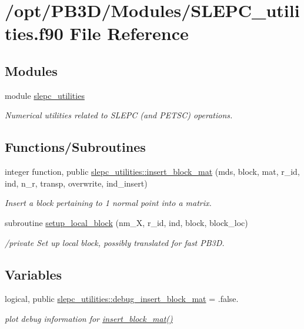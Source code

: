 \hypertarget{SLEPC__utilities_8f90}{}\section{/opt/\+P\+B3\+D/\+Modules/\+S\+L\+E\+P\+C\+\_\+utilities.f90 File Reference}
\label{SLEPC__utilities_8f90}
\subsection*{Modules}
\begin{DoxyCompactItemize}
\item 
module \hyperlink{namespaceslepc__utilities}{slepc\+\_\+utilities}
\begin{DoxyCompactList}\small\item\em Numerical utilities related to S\+L\+E\+PC (and P\+E\+T\+SC) operations. \end{DoxyCompactList}\end{DoxyCompactItemize}
\subsection*{Functions/\+Subroutines}
\begin{DoxyCompactItemize}
\item 
integer function, public \hyperlink{namespaceslepc__utilities_aa34aa361f0bfff9621ecba179f9ed0c6}{slepc\+\_\+utilities\+::insert\+\_\+block\+\_\+mat} (mds, block, mat, r\+\_\+id, ind, n\+\_\+r, transp, overwrite, ind\+\_\+insert)
\begin{DoxyCompactList}\small\item\em Insert a block pertaining to 1 normal point into a matrix. \end{DoxyCompactList}\item 
subroutine \hyperlink{SLEPC__utilities_8f90_a711d6be49d3b1542ee3375bceb5b4e6d}{setup\+\_\+local\+\_\+block} (nm\+\_\+X, r\+\_\+id, ind, block, block\+\_\+loc)
\begin{DoxyCompactList}\small\item\em /private Set up local block, possibly translated for fast P\+B3D. \end{DoxyCompactList}\end{DoxyCompactItemize}
\subsection*{Variables}
\begin{DoxyCompactItemize}
\item 
logical, public \hyperlink{namespaceslepc__utilities_a5cb92553633cb22ff703286298862ac7}{slepc\+\_\+utilities\+::debug\+\_\+insert\+\_\+block\+\_\+mat} = .false.
\begin{DoxyCompactList}\small\item\em plot debug information for \hyperlink{namespaceslepc__utilities_aa34aa361f0bfff9621ecba179f9ed0c6}{insert\+\_\+block\+\_\+mat()} \end{DoxyCompactList}\end{DoxyCompactItemize}


